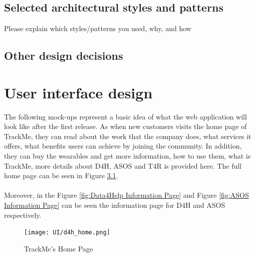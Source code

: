 \documentclass[a4paper, hidelinks, 12pt]{report}
\begin{document}
	\section{Selected architectural styles and patterns}
	Please explain which styles/patterns you
used, why, and how 

	\section{Other design decisions}
	
	\chapter{User interface design}
	The following mock-ups represent a basic idea of what the web application will look like after the first release.
	As when new customers visits the home page of TrackMe, they can read about the work that the company does, what services it offers, what benefits users can achieve by joining the community. In addition, they can buy the wearables and get more information, how to use them, what is TrackMe, more details about D4H, ASOS and T4R is provided here. The full home page can be seen in Figure \ref{fig:Home_Page}. \\\\
	Moreover, in the Figure \ref{fig:Data4Help Information Page} and Figure \ref{fig:ASOS Information Page} can be seen the information page for D4H and ASOS respectively.
	
	\begin{figure}[H]
		\centering
		\texttt{[image: UI/d4h\_home.png]}
		\caption[UI: TrackMe's Home Page]{TrackMe's Home Page}
		\label{fig:Home_Page}
	\end{figure}
	
\end{document}
